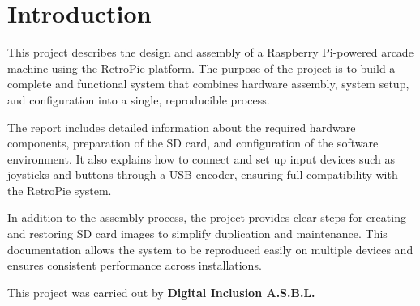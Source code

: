 {
  \setlength{\parskip}{1em}

  \chapter{Introduction}
  \label{cha:introduction}

  This project describes the design and assembly of a Raspberry Pi-powered arcade machine using the RetroPie platform. The purpose of the project is to build a complete and functional system that combines hardware assembly, system setup, and configuration into a single, reproducible process.

  The report includes detailed information about the required hardware components, preparation of the SD card, and configuration of the software environment. It also explains how to connect and set up input devices such as joysticks and buttons through a USB encoder, ensuring full compatibility with the RetroPie system.

  In addition to the assembly process, the project provides clear steps for creating and restoring SD card images to simplify duplication and maintenance. This documentation allows the system to be reproduced easily on multiple devices and ensures consistent performance across installations.

  This project was carried out by \textbf{Digital Inclusion A.S.B.L.}
}
